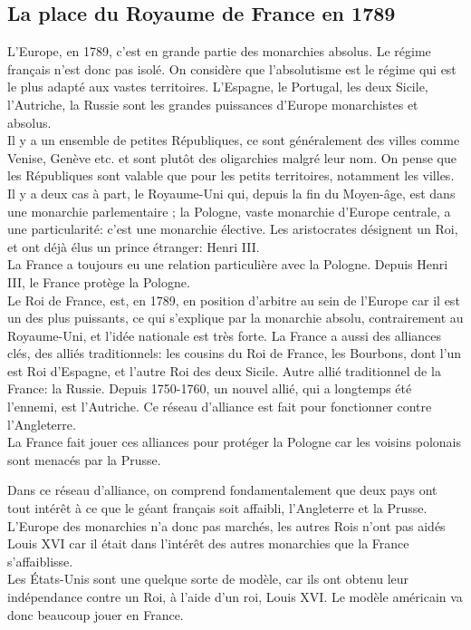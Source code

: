 \documentclass[10pt, a4paper, openany]{book}
\begin{document}
\subsection{La place du Royaume de France en 1789}

L'Europe, en 1789, c'est en grande partie des monarchies absolus. Le régime français n'est donc pas isolé. On considère que l'absolutisme est le régime qui est le plus adapté aux vastes territoires. L'Espagne, le Portugal, les deux Sicile, l'Autriche, la Russie sont les grandes puissances d'Europe monarchistes et absolus. \\
Il y a un ensemble de petites Républiques, ce sont généralement des villes comme Venise, Genève etc. et sont plutôt des oligarchies malgré leur nom. On pense que les Républiques sont valable que pour les petits territoires, notamment les villes. \\
Il y a deux cas à part, le Royaume-Uni qui, depuis la fin du Moyen-âge, est dans une monarchie parlementaire ; la Pologne, vaste monarchie d'Europe centrale, a une particularité: c'est une monarchie élective. Les aristocrates désignent un Roi, et ont déjà élus un prince étranger: Henri III. \\
La France a toujours eu une relation particulière avec la Pologne. Depuis Henri III, le France protège la Pologne. \\
Le Roi de France, est, en 1789, en position d'arbitre au sein de l'Europe car il est un des plus puissants, ce qui s'explique par la monarchie absolu, contrairement au Royaume-Uni, et l'idée nationale est très forte. La France a aussi des alliances clés, des alliés traditionnels: les cousins du Roi de France, les Bourbons, dont l'un est Roi d'Espagne, et l'autre Roi des deux Sicile. Autre allié traditionnel de la France: la Russie. Depuis 1750-1760, un nouvel allié, qui a longtemps été l'ennemi, est l'Autriche. Ce réseau d'alliance est fait pour fonctionner contre l'Angleterre. \\
La France fait jouer ces alliances pour protéger la Pologne car les voisins polonais sont menacés par la Prusse. 


Dans ce réseau d'alliance, on comprend fondamentalement que deux pays ont tout intérêt à ce que le géant français soit affaibli, l'Angleterre et la Prusse. \\
L'Europe des monarchies n'a donc pas marchés, les autres Rois n'ont pas aidés Louis XVI car il était dans l'intérêt des autres monarchies que la France s'affaiblisse. \\
Les États-Unis sont une quelque sorte de modèle, car ils ont obtenu leur indépendance contre un Roi, à l'aide d'un roi, Louis XVI. Le modèle américain va donc beaucoup jouer en France. 
\end{document}
